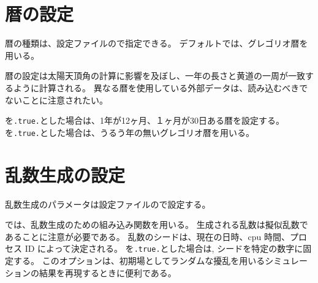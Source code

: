 \section{暦の設定} \label{subsec:calendar}

暦の種類は、設定ファイルので指定できる。
デフォルトでは、グレゴリオ暦を用いる。


\noindent
暦の設定は太陽天頂角の計算に影響を及ぼし、一年の長さと黄道の一周が一致するように計算される。
異なる暦を使用している外部データは、読み込むべきでないことに注意されたい。

を\verb|.true.|とした場合は、1年が12ヶ月、１ヶ月が30日ある暦を設定する。
を\verb|.true.|とした場合は、うるう年の無いグレゴリオ暦を用いる。


\section{乱数生成の設定} \label{subsec:random}

乱数生成のパラメータは設定ファイルので設定する。


\noindent
\scalelib では、乱数生成のための組み込み関数を用いる。
生成される乱数は擬似乱数であることに注意が必要である。
乱数のシードは、現在の日時、cpu 時間、プロセス ID によって決定される。
%
を\verb|.true.|とした場合は, シードを特定の数字に固定する。
このオプションは、初期場としてランダムな擾乱を用いるシミュレーションの結果を再現するときに便利である。


